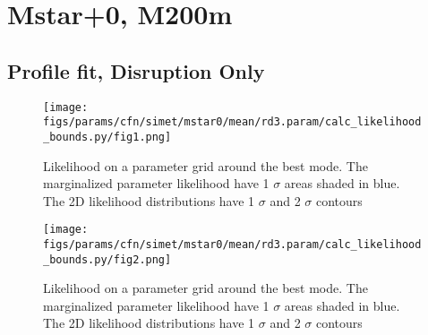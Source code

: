 \documentclass[twocolumn]{article}
\begin{document}






\onecolumn
\section{Mstar+0, M200m}
\subsection{Profile fit, Disruption Only}
\begin{figure}[H]
  \center\texttt{[image: figs/params/cfn/simet/mstar0/mean/rd3.param/calc\_likelihood\_bounds.py/fig1.png]}
  \caption{Likelihood on a parameter grid around the best mode. The marginalized parameter likelihood have
    1 $\sigma$ areas shaded in blue. The 2D likelihood distributions have 1 $\sigma$  and 2 $\sigma$ contours}
  \label{fig:basic_rd:likelihood}
\end{figure}

\begin{figure}[H]
  \center\texttt{[image: figs/params/cfn/simet/mstar0/mean/rd3.param/calc\_likelihood\_bounds.py/fig2.png]}
  \caption{Likelihood on a parameter grid around the best mode. The marginalized parameter likelihood have
    1 $\sigma$ areas shaded in blue. The 2D likelihood distributions have 1 $\sigma$  and 2 $\sigma$ contours}
  \label{fig:basic_rd:likelihood}
\end{figure}
\end{document}
